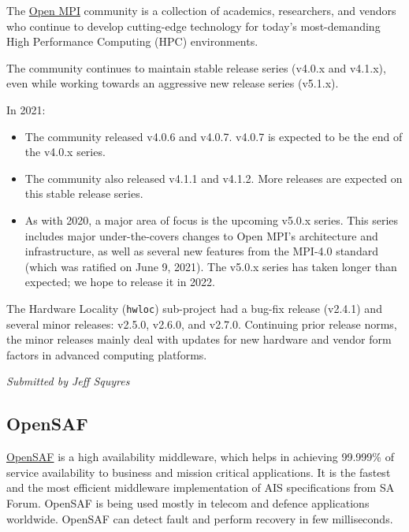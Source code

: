 \documentclass[a4paper]{report}
\begin{document}
The \href{https://www.open-mpi.org/}{Open MPI} community is a collection of academics, researchers, and vendors who continue to develop cutting-edge technology for today's most-demanding High Performance Computing (HPC) environments.

The community continues to maintain stable release series (v4.0.x and v4.1.x), even while working towards an aggressive new release series (v5.1.x).

In 2021:

\begin{itemize}

\item The community released v4.0.6 and v4.0.7.  v4.0.7 is expected to be the end of the v4.0.x series.

\item The community also released v4.1.1 and v4.1.2.  More releases are expected on this stable release series.

\item As with 2020, a major area of focus is the upcoming v5.0.x series. This series includes major under-the-covers changes to Open MPI's architecture and infrastructure, as well as several new features from the MPI-4.0 standard (which was ratified on June 9, 2021).  The v5.0.x series has taken longer than expected; we hope to release it in 2022.

\end{itemize}

The Hardware Locality (\texttt{hwloc}) sub-project had a bug-fix release (v2.4.1) and several minor releases: v2.5.0, v2.6.0, and v2.7.0.  Continuing prior release norms, the minor releases mainly deal with updates for new hardware and vendor form factors in advanced computing platforms.

{\em Submitted by Jeff Squyres}

\subsection{OpenSAF}

\href{https://opensaf.sourceforge.io/}{OpenSAF} is a high availability middleware, which helps in achieving 99.999\% of service availability to business and mission critical applications. It is the fastest and the most efficient middleware implementation of AIS specifications from SA Forum. OpenSAF is being used mostly in telecom and defence applications worldwide. OpenSAF can detect fault and perform recovery in few milliseconds.
\end{document}
